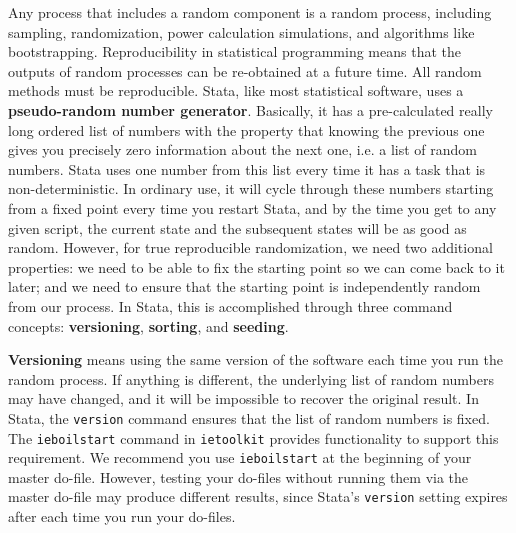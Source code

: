 Any process that includes a random component is a random process,
including sampling, randomization, power calculation simulations, and algorithms like bootstrapping.
Reproducibility in statistical programming means that the outputs of random processes
can be re-obtained at a future time.
All random methods must be reproducible.\cite{orozco2018make}
Stata, like most statistical software, uses a \textbf{pseudo-random number generator}.
Basically, it has a pre-calculated really long ordered list of numbers with the property that
knowing the previous one gives you precisely zero information about the next one, i.e. a list of random numbers.
Stata uses one number from this list every time it has a task that is non-deterministic.
In ordinary use, it will cycle through these numbers starting from a fixed point
every time you restart Stata, and by the time you get to any given script,
the current state and the subsequent states will be as good as random.
However, for true reproducible randomization, we need two additional properties:
we need to be able to fix the starting point so we can come back to it later;
and we need to ensure that the starting point is independently random from our process.
In Stata, this is accomplished through three command concepts:
\textbf{versioning}, \textbf{sorting}, and \textbf{seeding}.

\textbf{Versioning} means using the same version of the software each time you run the random process.
If anything is different, the underlying list of random numbers may have changed,
and it will be impossible to recover the original result.
In Stata, the \texttt{version} command ensures that the list of random numbers is fixed.
The \texttt{ieboilstart} command in \texttt{ietoolkit} provides functionality to support this requirement.
We recommend you use \texttt{ieboilstart} at the beginning of your master do-file.
However, testing your do-files without running them
via the master do-file may produce different results,
since Stata's \texttt{version} setting expires after each time you run your do-files.

